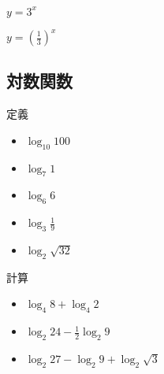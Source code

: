 \documentclass[10pt,dvipdfmx]{jsarticle}
\begin{document}
\begin{table}[H]
  \begin{minipage}{0.5\linewidth}
    $y=3^x$
    \begin{center}
    \end{center}
  \end{minipage}
  \begin{minipage}{0.5\linewidth}
    $y=(\frac{1}{3})^x$
    \begin{center}
    \end{center}
  \end{minipage}
\end{table}

\subsection*{対数関数}
\begin{itembox}[l]{定義}
  \begin{multicols}{3}
    \begin{large}
      \begin{itemize}
        \item $\log_{10}100$
        \item $\log_{7}1$
        \item $\log_{6}6$
        \item $\log_{3}\frac{1}{9}$
        \item $\log_{2}\sqrt{32}$
      \end{itemize}
    \end{large}
  \end{multicols}
\end{itembox}

\begin{itembox}[l]{計算}
  \begin{multicols}{3}
    \begin{large}
      \begin{itemize}
        \item $\log_{4}8+\log_{4}2$
        \item $\log_{2}24-\frac{1}{2}\log_{2}9$
        \item $\log_{2}27-\log_{2}9+\log_{2}\sqrt{3}$
      \end{itemize}
    \end{large}
  \end{multicols}
\end{itembox}
\end{document}
